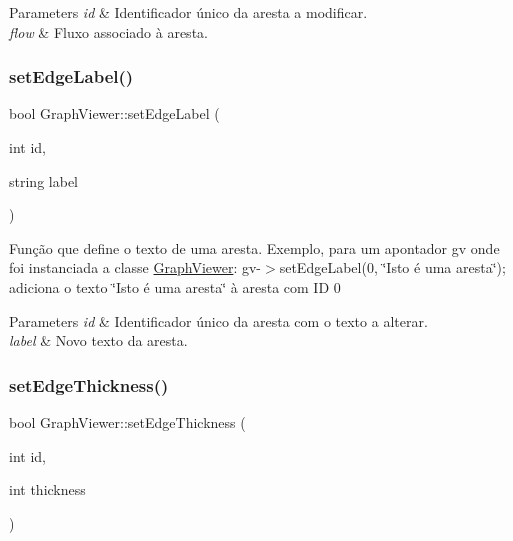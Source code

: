 \begin{DoxyParams}{Parameters}
{\em id} & Identificador único da aresta a modificar. \\
\hline
{\em flow} & Fluxo associado à aresta. \\
\hline
\end{DoxyParams}
\mbox{\label{class_graph_viewer_a447cca0064e785654c2105602c2961ca}} 
\subsubsection{\texorpdfstring{set\+Edge\+Label()}{setEdgeLabel()}}
{\footnotesize\ttfamily bool Graph\+Viewer\+::set\+Edge\+Label (\begin{DoxyParamCaption}\item[{int}]{id,  }\item[{string}]{label }\end{DoxyParamCaption})}

Função que define o texto de uma aresta. Exemplo, para um apontador gv onde foi instanciada a classe \hyperlink{class_graph_viewer}{Graph\+Viewer}\+: gv-\/$>$set\+Edge\+Label(0, \char`\"{}\+Isto é uma aresta\char`\"{}); adiciona o texto \char`\"{}\+Isto é uma aresta\char`\"{} à aresta com ID 0


\begin{DoxyParams}{Parameters}
{\em id} & Identificador único da aresta com o texto a alterar. \\
\hline
{\em label} & Novo texto da aresta. \\
\hline
\end{DoxyParams}
\mbox{\label{class_graph_viewer_a07f598272fe3515455eab13be749604a}} 
\subsubsection{\texorpdfstring{set\+Edge\+Thickness()}{setEdgeThickness()}}
{\footnotesize\ttfamily bool Graph\+Viewer\+::set\+Edge\+Thickness (\begin{DoxyParamCaption}\item[{int}]{id,  }\item[{int}]{thickness }\end{DoxyParamCaption})}

